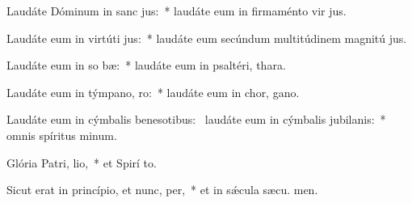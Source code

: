 \item Laudáte Dóminum in sanc jus:~* laudáte eum in firmaménto vir jus.
\item Laudáte eum in virtúti jus:~* laudáte eum secúndum multitúdinem magnitú jus.
\item Laudáte eum in so bæ:~* laudáte eum in psaltéri,  thara.
\item Laudáte eum in týmpano,  ro:~* laudáte eum in chor,  gano.
\item Laudáte eum in cýmbalis benesotibus:~\pscross{} laudáte eum in cýmbalis jubilanis:~* omnis spíritus  minum.
\item Glória Patri,  lio,~* et Spirí to.
\item Sicut erat in princípio, et nunc,  per,~* et in sǽcula sæcu. men.
